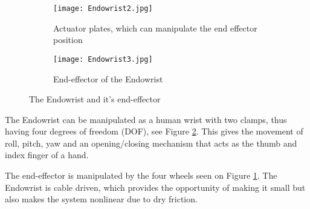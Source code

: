 \begin{figure}
  \centering
  \begin{subfigure}{.22\textwidth}
    \centering
    \texttt{[image: Endowrist2.jpg]}
    \caption{Actuator plates, which can manipulate the end effector position}
    \label{fig:Endo_plates}
  \end{subfigure}
  \begin{subfigure}{.22\textwidth}
    \centering
    \texttt{[image: Endowrist3.jpg]}
    \caption{End-effector of the Endowrist\newline}
    \label{fig:Endo_end}
  \end{subfigure}
\caption{The Endowrist and it's end-effector}
\label{fig:endowrits_set}
\end{figure}


The Endowrist can be manipulated as a human wrist with two clamps, thus having four degrees of freedom (DOF), see Figure \ref{fig:Endo_end}. This gives the movement of roll, pitch, yaw and an opening/closing mechanism that acts as the thumb and index finger of a hand.


The end-effector is manipulated by the four wheels seen on Figure \ref{fig:Endo_plates}. The Endowrist is cable driven, which provides the opportunity of making it small but also makes the system nonlinear due to dry friction.






